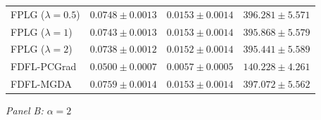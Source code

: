 \begin{table}[htbp]
\begin{tabular}{l ccc}
FPLG ($\lambda\!=\!0.5$)                     & $0.0748 \pm 0.0013$ & $0.0153 \pm 0.0014$ & $396.281 \pm 5.571$ \\
FPLG ($\lambda\!=\!1$)                       & $0.0743 \pm 0.0013$ & $0.0153 \pm 0.0014$ & $395.868 \pm 5.579$ \\
FPLG ($\lambda\!=\!2$)                       & $0.0738 \pm 0.0012$ & $0.0152 \pm 0.0014$ & $395.441 \pm 5.589$ \\
\midrule
FDFL-PCGrad                                  & $0.0500 \pm 0.0007$ & $0.0057 \pm 0.0005$ & $140.228 \pm 4.261$ \\
FDFL-MGDA                                    & $0.0759 \pm 0.0014$ & $0.0153 \pm 0.0014$ & $397.072 \pm 5.562$ \\
\bottomrule
\end{tabular}

\bigskip
\textit{Panel B: $\alpha = 2$}


\end{table}
